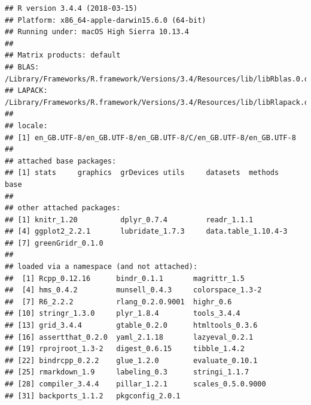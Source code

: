 \documentclass[]{article}
\begin{document}
\begin{verbatim}
## R version 3.4.4 (2018-03-15)
## Platform: x86_64-apple-darwin15.6.0 (64-bit)
## Running under: macOS High Sierra 10.13.4
## 
## Matrix products: default
## BLAS: /Library/Frameworks/R.framework/Versions/3.4/Resources/lib/libRblas.0.dylib
## LAPACK: /Library/Frameworks/R.framework/Versions/3.4/Resources/lib/libRlapack.dylib
## 
## locale:
## [1] en_GB.UTF-8/en_GB.UTF-8/en_GB.UTF-8/C/en_GB.UTF-8/en_GB.UTF-8
## 
## attached base packages:
## [1] stats     graphics  grDevices utils     datasets  methods   base     
## 
## other attached packages:
## [1] knitr_1.20          dplyr_0.7.4         readr_1.1.1        
## [4] ggplot2_2.2.1       lubridate_1.7.3     data.table_1.10.4-3
## [7] greenGridr_0.1.0   
## 
## loaded via a namespace (and not attached):
##  [1] Rcpp_0.12.16      bindr_0.1.1       magrittr_1.5     
##  [4] hms_0.4.2         munsell_0.4.3     colorspace_1.3-2 
##  [7] R6_2.2.2          rlang_0.2.0.9001  highr_0.6        
## [10] stringr_1.3.0     plyr_1.8.4        tools_3.4.4      
## [13] grid_3.4.4        gtable_0.2.0      htmltools_0.3.6  
## [16] assertthat_0.2.0  yaml_2.1.18       lazyeval_0.2.1   
## [19] rprojroot_1.3-2   digest_0.6.15     tibble_1.4.2     
## [22] bindrcpp_0.2.2    glue_1.2.0        evaluate_0.10.1  
## [25] rmarkdown_1.9     labeling_0.3      stringi_1.1.7    
## [28] compiler_3.4.4    pillar_1.2.1      scales_0.5.0.9000
## [31] backports_1.1.2   pkgconfig_2.0.1
\end{verbatim}
\end{document}

